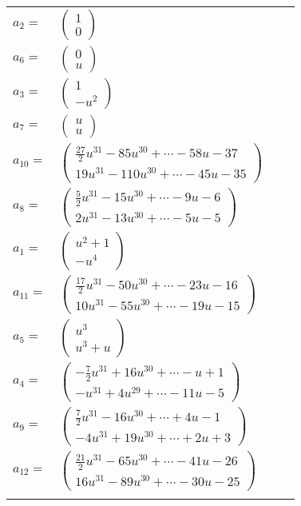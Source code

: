 \documentclass[1p]{elsarticle_modified}
\theoremstyle{definition}
\begin{document}
\begin{tabular}{m{7pt} m{180pt} m{7pt} m{180pt} }
\flushright $a_{2}=$&$\begin{pmatrix}1\\0\end{pmatrix}$ \\
\flushright $a_{6}=$&$\begin{pmatrix}0\\u\end{pmatrix}$ \\
\flushright $a_{3}=$&$\begin{pmatrix}1\\- u^2\end{pmatrix}$ \\
\flushright $a_{7}=$&$\begin{pmatrix}u\\u\end{pmatrix}$ \\
\flushright $a_{10}=$&$\begin{pmatrix}\frac{27}{2} u^{31}-85 u^{30}+\cdots-58 u-37\\19 u^{31}-110 u^{30}+\cdots-45 u-35\end{pmatrix}$ \\
\flushright $a_{8}=$&$\begin{pmatrix}\frac{5}{2} u^{31}-15 u^{30}+\cdots-9 u-6\\2 u^{31}-13 u^{30}+\cdots-5 u-5\end{pmatrix}$ \\
\flushright $a_{1}=$&$\begin{pmatrix}u^2+1\\- u^4\end{pmatrix}$ \\
\flushright $a_{11}=$&$\begin{pmatrix}\frac{17}{2} u^{31}-50 u^{30}+\cdots-23 u-16\\10 u^{31}-55 u^{30}+\cdots-19 u-15\end{pmatrix}$ \\
\flushright $a_{5}=$&$\begin{pmatrix}u^3\\u^3+u\end{pmatrix}$ \\
\flushright $a_{4}=$&$\begin{pmatrix}-\frac{7}{2} u^{31}+16 u^{30}+\cdots- u+1\\- u^{31}+4 u^{29}+\cdots-11 u-5\end{pmatrix}$ \\
\flushright $a_{9}=$&$\begin{pmatrix}\frac{7}{2} u^{31}-16 u^{30}+\cdots+4 u-1\\-4 u^{31}+19 u^{30}+\cdots+2 u+3\end{pmatrix}$ \\
\flushright $a_{12}=$&$\begin{pmatrix}\frac{21}{2} u^{31}-65 u^{30}+\cdots-41 u-26\\16 u^{31}-89 u^{30}+\cdots-30 u-25\end{pmatrix}$\\&\end{tabular}
\end{document}
